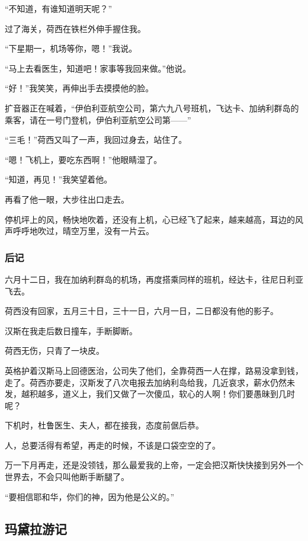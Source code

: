 \par “不知道，有谁知道明天呢？”
\par 过了海关，荷西在铁栏外伸手握住我。
\par “下星期一，机场等你，嗯！”我说。
\par “马上去看医生，知道吧！家事等我回来做。”他说。
\par “好！”我笑笑，再伸出手去摸摸他的脸。
\par 扩音器正在喊着，“伊伯利亚航空公司，第六九八号班机，飞达卡、加纳利群岛的乘客，请在一号门登机，伊伯利亚航空公司第——”
\par “三毛！”荷西又叫了一声，我回过身去，站住了。
\par “嗯！飞机上，要吃东西啊！”他眼睛湿了。
\par “知道，再见！”我笑望着他。
\par 再看了他一眼，大步往出口走去。
\par 停机坪上的风，畅快地吹着，还没有上机，心已经飞了起来，越来越高，耳边的风声呼呼地吹过，晴空万里，没有一片云。
\subsubsection{后记}
\par 六月十二日，我在加纳利群岛的机场，再度搭乘同样的班机，经达卡，往尼日利亚飞去。
\par 荷西没有回家，五月三十日，三十一日，六月一日，二日都没有他的影子。
\par 汉斯在我走后数日撞车，手断脚断。
\par 荷西无伤，只青了一块皮。
\par 英格护着汉斯马上回德医治，公司失了他们，全靠荷西一人在撑，路易没拿到钱，走了。荷西亦要走，汉斯发了八次电报去加纳利岛给我，几近哀求，薪水仍然未发，越积越多，道义上，我们又做了一次傻瓜，软心的人啊！你们要愚昧到几时呢？
\par 下机时，杜鲁医生、夫人，都在接我，态度前倨后恭。
\par 人，总要活得有希望，再走的时候，不该是口袋空空的了。
\par 万一下月再走，还是没领钱，那么最爱我的上帝，一定会把汉斯快快接到另外一个世界去，不会只叫他断手断腿了。
\par “要相信耶和华，你们的神，因为他是公义的。”














\subsection{玛黛拉游记}

